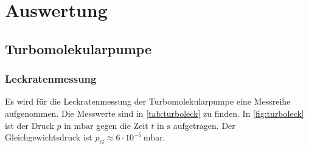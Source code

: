\section{Auswertung}
\label{sec:Auswertung}

\subsection{Turbomolekularpumpe}
\subsubsection{Leckratenmessung}
Es wird für die Leckratenmessung der Turbomolekularpumpe eine Messreihe aufgenommen. Die Messwerte sind in
\autoref{tab:turboleck} zu finden. In \autoref{fig:turboleck} ist der Druck $p$ in $\si{\milli\bar}$ gegen die
Zeit $t$ in $\si{\second}$ aufgetragen. Der Gleichgewichtsdruck ist $p_G \approx 6 \cdot 10^{-5} \,\si{\milli\bar}$.
